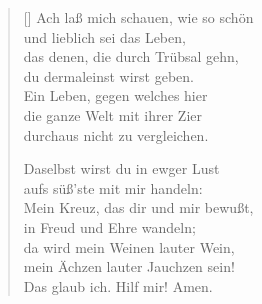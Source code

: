 \begin{multicols}{2}
\begin{verse}[\versewidth]
 Ach laß mich schauen, wie so schön\\
und lieblich sei das Leben,\\
das denen, die durch Trübsal gehn,\\
du dermaleinst wirst geben.\\
Ein Leben, gegen welches hier\\
die ganze Welt mit ihrer Zier\\
durchaus nicht zu vergleichen.

 Daselbst wirst du in ewger Lust\\
aufs süß'ste mit mir handeln:\\
Mein Kreuz, das dir und mir bewußt,\\
in Freud und Ehre wandeln;\\
da wird mein Weinen lauter Wein,\\
mein Ächzen lauter Jauchzen sein!\\
Das glaub ich. Hilf mir! Amen.

\end{verse}
\end{multicols}
